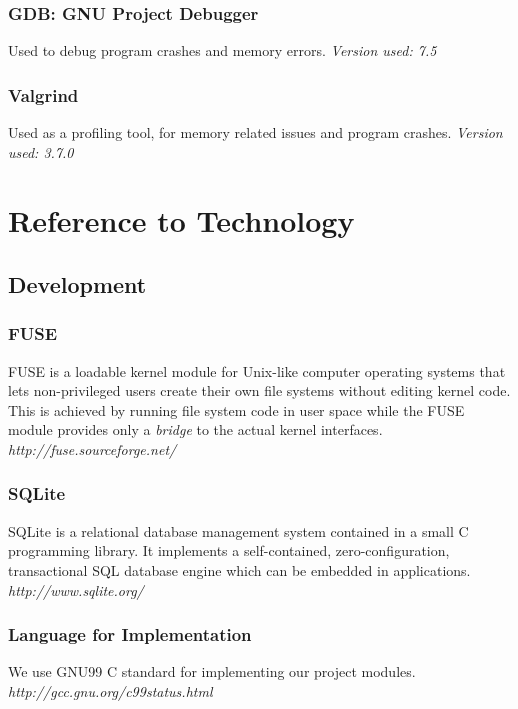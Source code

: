 \subsubsection{GDB: GNU Project Debugger}
Used to debug program crashes and memory errors. \newline
\emph{Version used: 7.5}

\subsubsection{Valgrind}
Used as a profiling tool, for memory related issues and program crashes. \newline
\emph{Version used: 3.7.0}

\section{Reference to Technology}
\subsection{Development}
\subsubsection {FUSE}
FUSE is a loadable kernel module for Unix-like computer operating systems that lets non-privileged users create their own file systems without editing kernel code. This is achieved by running file system code in user space while the FUSE module provides only a \textit{bridge} to the actual kernel interfaces. \newline
\emph{http://fuse.sourceforge.net/}

\subsubsection {SQLite}
SQLite is a relational database management system contained in a small C programming library. It implements a self-contained, zero-configuration, transactional SQL database engine which can be embedded in applications. \newline
\emph{http://www.sqlite.org/}

\subsubsection {Language for Implementation}
We use GNU99 C standard for implementing our project modules. \newline
\emph{http://gcc.gnu.org/c99status.html}

